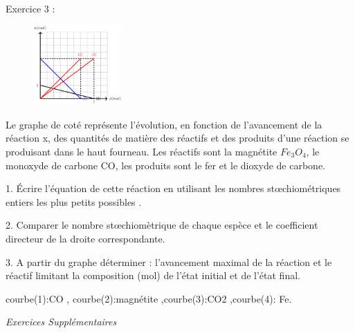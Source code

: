 \documentclass[12pt, french]{article}
\begin{document}
\begin{Box2}{Exercice 3 :}
  
   \begin{figure}
  \begin{center}
    \includegraphics[width=0.3\textwidth]{./img/img00.png}
  \end{center}
\end{figure}

   Le graphe de coté représente l’évolution, en fonction de l’avancement de la réaction x, des quantités de matière des réactifs et des produits  d’une réaction se produisant dans le haut fourneau. Les réactifs sont la magnétite $Fe_3O_4$, le monoxyde de carbone CO, les produits sont le fer et le dioxyde de carbone.

1. Écrire l’équation de cette réaction en utilisant les nombres stœchiométriques entiers les plus petits possibles .

2. Comparer le nombre stœchiomètrique de chaque espèce et le coefficient directeur de la droite correspondante.

3. A partir du graphe déterminer : l’avancement maximal de la réaction et le réactif limitant la composition (mol) de l’état initial et de l’état final.

courbe(1):CO , courbe(2):magnétite ,courbe(3):CO2 ,courbe(4): Fe.
\end{Box2}

\vspace{2cm}
\begin{center}
   \Large{ \em{Exercices Supplémentaires}}
\end{center}
\end{document}

